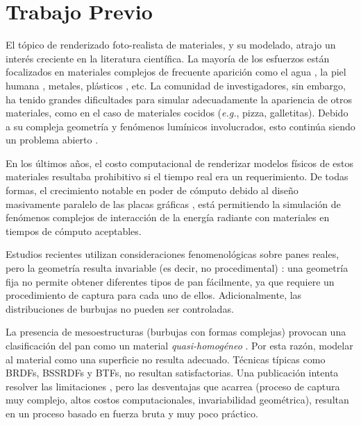 \section{Trabajo Previo}
El tópico de renderizado foto-realista de materiales, y su modelado, atrajo un interés creciente en la literatura científica.
La mayoría de los esfuerzos están focalizados en materiales complejos de frecuente aparición como el agua \cite{Schechter2012}, la piel humana \cite{Donner2006}, metales, plásticos \cite{Kurt2010}, etc.
La comunidad de investigadores, sin embargo, ha tenido grandes dificultades para simular adecuadamente la apariencia de otros materiales, como en el caso de materiales cocidos ({\em e.g.}, pizza, galletitas).
Debido a su compleja geometría y fenómenos lumínicos involucrados, esto continúa siendo un problema abierto \cite{Voglsam2013}.

En los últimos años, el costo computacional de renderizar modelos físicos de estos materiales resultaba prohibitivo si el tiempo real era un requerimiento.
De todas formas, el crecimiento notable en poder de cómputo debido al diseño masivamente paralelo de las placas gráficas \cite{Yeo09,Harris06}, está permitiendo la simulación de fenómenos complejos de interacción de la energía radiante con materiales en tiempos de cómputo aceptables.


Estudios recientes utilizan consideraciones fenomenológicas sobre panes reales, pero la geometría resulta invariable (es decir, no procedimental) \cite{VanDyck2014}: una geometría fija no permite obtener diferentes tipos de pan fácilmente, ya que requiere un procedimiento de captura para cada uno de ellos.
Adicionalmente, las distribuciones de burbujas no pueden ser controladas.

La presencia de mesoestructuras (burbujas con formas complejas) provocan una clasificación del pan como un material {\em quasi-homogéneo} \cite{Tong2005}. 
Por esta razón, modelar al material como una superficie no resulta adecuado.
Técnicas típicas como BRDFs, BSSRDFs \cite{Donner2009} y BTFs, no resultan satisfactorias.
Una publicación intenta resolver las limitaciones \cite{Tong2005}, pero las desventajas que acarrea (proceso de captura muy complejo, altos costos computacionales, invariabilidad geométrica), resultan en un proceso basado en fuerza bruta y muy poco práctico.

